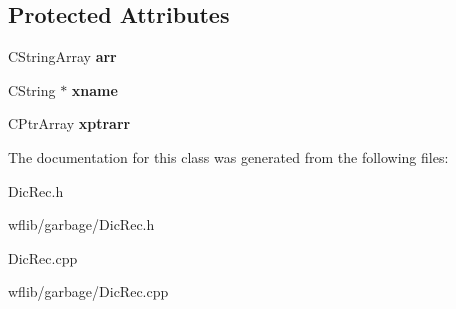 \subsection*{Protected Attributes}
\begin{DoxyCompactItemize}
\item 
\hypertarget{class_c_dic_rec_a8e949cd9ba21cc4211cd844214801083}{C\-String\-Array {\bfseries arr}}\label{class_c_dic_rec_a8e949cd9ba21cc4211cd844214801083}

\item 
\hypertarget{class_c_dic_rec_ab32a95229ca5f4ccf8e2016ee34bdd68}{C\-String $\ast$ {\bfseries xname}}\label{class_c_dic_rec_ab32a95229ca5f4ccf8e2016ee34bdd68}

\item 
\hypertarget{class_c_dic_rec_a37561dfbb077b2e47e187fb5a5b0fedc}{C\-Ptr\-Array {\bfseries xptrarr}}\label{class_c_dic_rec_a37561dfbb077b2e47e187fb5a5b0fedc}

\end{DoxyCompactItemize}


The documentation for this class was generated from the following files\-:\begin{DoxyCompactItemize}
\item 
Dic\-Rec.\-h\item 
wflib/garbage/Dic\-Rec.\-h\item 
Dic\-Rec.\-cpp\item 
wflib/garbage/Dic\-Rec.\-cpp\end{DoxyCompactItemize}
